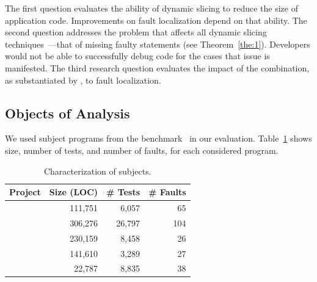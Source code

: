 \documentclass{article}
\begin{document}
The first question evaluates the ability of dynamic slicing to reduce
the size of application code. Improvements on fault localization
depend on that ability. The second question addresses the problem that
affects all dynamic slicing
techniques~\cite{Lin:2018:BDE:3238147.3238163}---that of missing
faulty statements (see Theorem~\ref{the:1}). Developers would
not be able to successfully debug code for the cases that issue is
manifested. The third research question evaluates the impact of the
combination, as substantiated by \comb, to fault localization.


%
%
\subsection{Objects of Analysis}\label{sec:analysis}


We used subject programs from the \dfj{}
benchmark~\cite{just-defects4j-issta2014} in our evaluation.
Table~\ref{tab:df4j} shows size, number of tests, and number of
faults, for each considered program.

\begin{table}[h]
  \small
  \centering
  \setlength{\tabcolsep}{4pt}
  \begin{tabular}{lrrr}
    \toprule
    Project            & Size (LOC) & \# Tests & \# Faults \\ %
    \midrule
    \lang{}            & 111,751  & 6,057 & 65       \\   %
    \cmath{}           & 306,276  & 26,797 & 104     \\   %
    \chart{}           & 230,159  & 8,458 & 26      \\  %
    \jtime{}           & 141,610  & 3,289 & 27       \\   %
    \mockito{}         & 22,787  & 8,835 & 38    \\     %
    \bottomrule
  \end{tabular}
  \caption {Characterization of \dfj{} subjects.}
  \label{tab:df4j}
\end{table}
\normalsize
\end{document}
